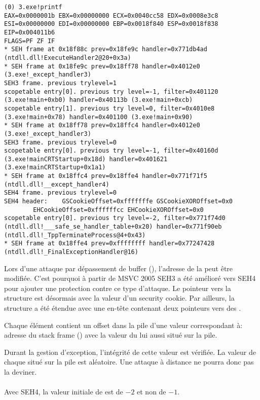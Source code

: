 \begin{lstlisting}[caption=tracer.exe output]
(0) 3.exe!printf
EAX=0x0000001b EBX=0x00000000 ECX=0x0040cc58 EDX=0x0008e3c8
ESI=0x00000000 EDI=0x00000000 EBP=0x0018f840 ESP=0x0018f838
EIP=0x004011b6
FLAGS=PF ZF IF
* SEH frame at 0x18f88c prev=0x18fe9c handler=0x771db4ad (ntdll.dll!ExecuteHandler2@20+0x3a)
* SEH frame at 0x18fe9c prev=0x18ff78 handler=0x4012e0 (3.exe!_except_handler3)
SEH3 frame. previous trylevel=1
scopetable entry[0]. previous try level=-1, filter=0x401120 (3.exe!main+0xb0) handler=0x40113b (3.exe!main+0xcb)
scopetable entry[1]. previous try level=0, filter=0x4010e8 (3.exe!main+0x78) handler=0x401100 (3.exe!main+0x90)
* SEH frame at 0x18ff78 prev=0x18ffc4 handler=0x4012e0 (3.exe!_except_handler3)
SEH3 frame. previous trylevel=0
scopetable entry[0]. previous try level=-1, filter=0x40160d (3.exe!mainCRTStartup+0x18d) handler=0x401621 (3.exe!mainCRTStartup+0x1a1)
* SEH frame at 0x18ffc4 prev=0x18ffe4 handler=0x771f71f5 (ntdll.dll!__except_handler4)
SEH4 frame. previous trylevel=0
SEH4 header:	GSCookieOffset=0xfffffffe GSCookieXOROffset=0x0
		EHCookieOffset=0xffffffcc EHCookieXOROffset=0x0
scopetable entry[0]. previous try level=-2, filter=0x771f74d0 (ntdll.dll!___safe_se_handler_table+0x20) handler=0x771f90eb (ntdll.dll!_TppTerminateProcess@4+0x43)
* SEH frame at 0x18ffe4 prev=0xffffffff handler=0x77247428 (ntdll.dll!_FinalExceptionHandler@16)
\end{lstlisting}


\myindex{\BufferOverflow}
Lors d'une attaque par dépassement de buffer (), l'adresse de la 
 peut être modifiée. C'est pourquoi à partir de MSVC 2005 SEH3 a été amélioré vers 
SEH4 pour ajouter une protection contre ce type d'attaque.
Le pointeur vers la structure  est désormais  avec la valeur 
d'un \gls{security cookie}.
Par ailleurs, la structure  a été étendue avec une en-tête contenant deux pointeurs 
vers des .

Chaque élément contient un offset dans la pile d'une valeur correspondant à: 
adresse du \gls{stack frame} (\EBP)  avec la valeur du  
lui aussi situé sur la pile.

Durant la gestion d'exception, l'intégrité de cette valeur est vérifiée.
La valeur de chaque  situé sur la pile est aléatoire. Une attaque à distance ne 
pourra donc pas la deviner. \\
\\
Avec SEH4, la valeur initiale de  est de $-2$ et non de $-1$.

